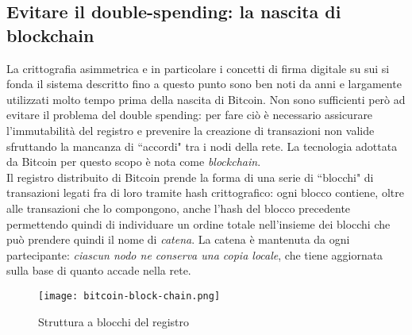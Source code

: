 	\subsection{Evitare il double-spending: la nascita di blockchain}
		La crittografia asimmetrica e in particolare i concetti di firma digitale su sui si fonda il sistema descritto fino a questo punto sono ben noti da anni e largamente utilizzati molto tempo prima della nascita di Bitcoin. Non sono sufficienti però ad evitare il problema del double spending: per fare ciò è necessario assicurare l'immutabilità del registro e prevenire la creazione di transazioni non valide sfruttando la mancanza di ``accordi" tra i nodi della rete. La tecnologia adottata da Bitcoin per questo scopo è nota come \emph{blockchain}. \\
		Il registro distribuito di Bitcoin prende la forma di una serie di ``blocchi" di transazioni legati fra di loro tramite hash crittografico: ogni blocco contiene, oltre alle transazioni che lo compongono, anche l'hash del blocco precedente permettendo quindi di individuare un ordine totale nell'insieme dei blocchi che può prendere quindi il nome di \emph{catena}. La catena è mantenuta da ogni partecipante: \emph{ciascun nodo ne conserva una copia locale}, che tiene aggiornata sulla base di quanto accade nella rete.
		\begin{figure}[ht]
			\centering
			\texttt{[image: bitcoin-block-chain.png]}
			\caption{Struttura a blocchi del registro}
			\label{fig:bitcoin_chain}
		\end{figure}
